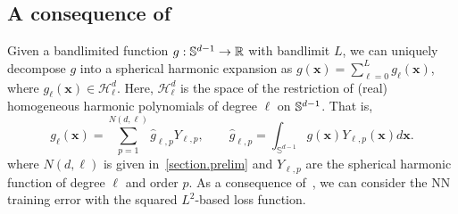 
\subsection{A consequence of~}

Given a bandlimited function $g: {\mathbb{S}}^{d-1} \rightarrow \mathbb{R}$ with bandlimit $L$, we can uniquely decompose $g$ into a spherical harmonic expansion as $ g(\mathbf{x}) = \sum_{\ell=0}^L g_\ell(\mathbf{x})$, where $ g_\ell(\mathbf{x}) \in \mathcal{H}_\ell^d$. Here, $\mathcal{H}^d_\ell$ is the space of the restriction of (real) homogeneous harmonic polynomials of degree $\ell$ on ${\mathbb{S}}^{d-1}$. That is,
\[
g_\ell(\mathbf{x})  =  \sum_{p=1}^{N(d,\ell)} \hat{g}_{\ell,p} Y_{\ell,p}, \qquad \hat{g}_{\ell,p} = \int_{\mathbb{S}^{d-1}}g(\mathbf{x}) {Y_{\ell,p}}(\mathbf{x}) d\mathbf{x}.
\] 
where $N(d,\ell)$ is given in~\cref{section.prelim} and $Y_{\ell,p}$ are the spherical harmonic function of degree $\ell$ and order $p$.  As a consequence of~, we can consider the NN training error with the squared $L^2$-based loss function. 


